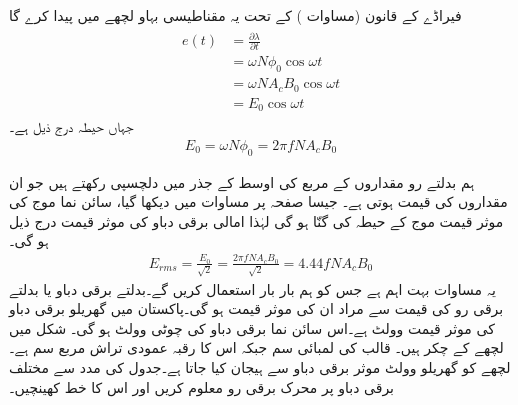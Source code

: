 فیراڈے کے قانون  (مساوات )  کے تحت یہ مقناطیسی بہاو  لچھے میں    پیدا کرے گا
\begin{gather}
\begin{aligned}
e(t)&=\frac{\partial \lambda}{\partial t}\\
&=\omega N \phi_0 \cos \omega t \\
&=\omega N A_c B_0 \cos \omega t\\
&=E_0 \cos \omega t
\end{aligned}
\end{gather}
جہاں حیطہ  درج ذیل ہے۔
\begin{align}
E_0=\omega N \phi_0=2 \pi f N A_c B_0
\end{align}

ہم بدلتے رو مقداروں کے مربع کی اوسط کے جذر  میں دلچسپی رکھتے ہیں جو ان مقداروں کی  قیمت ہوتی ہے۔ جیسا صفحہ  پر مساوات   میں دیکھا گیا،  سائن نما  موج کی موثر قیمت موج کے حیطہ کی   گنّا ہو گی  لہٰذا امالی برقی دباو کی موثر قیمت  درج ذیل ہو گی۔
\begin{align}\label{مساوات_مقناطیسی_دور_پیدا_دباو_موثر_قیمت}
E_{rms}=\frac{E_0}{\sqrt{2}}=\frac{2 \pi f N A_c B_0}{\sqrt{2}}=4.44 f N A_c B_0
\end{align}
یہ مساوات بہت اہم ہے  جس کو ہم بار بار استعمال کریں گے۔بدلتے برقی دباو یا بدلتے برقی رو کی قیمت سے مراد ان کی موثر  قیمت ہو گی۔پاکستان میں گھریلو برقی دباو کی موثر قیمت  وولٹ ہے۔اس سائن نما برقی دباو کی چوٹی  وولٹ ہو گی۔
%
شکل  میں لچھے کے  چکر ہیں۔ قالب کی لمبائی  سم جبکہ اس کا رقبہ عمودی تراش  مربع سم ہے۔لچھے  کو گھریلو  وولٹ موثر برقی دباو سے ہیجان  کیا جاتا ہے۔جدول  کی مدد سے مختلف برقی دباو پر محرک برقی رو معلوم کریں اور اس کا خط کھینچیں۔

